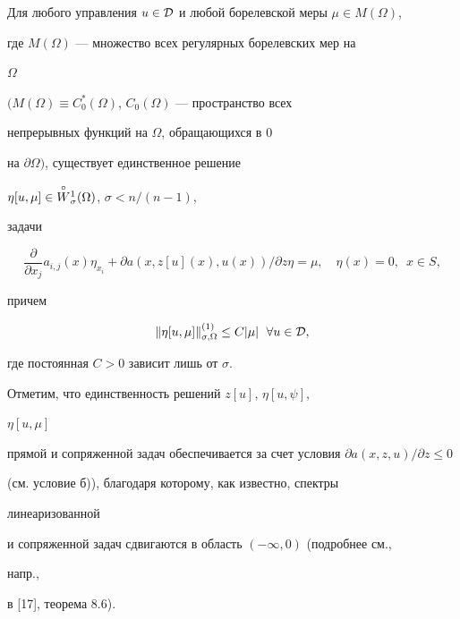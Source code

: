 \begin{lems} 


Для любого управления $u\in\cal D$ и любой борелевской меры $\mu\in 


M(\Omega)$, 


где $M(\Omega)$ --- множество всех регулярных борелевских мер на 


$\Omega$


$(M(\Omega)\equiv C^*_0(\Omega)$, $C_0(\Omega)$ --- пространство всех 


непрерывных функций на $\Omega$, обращающихся в $0$ 


на $\partial\Omega)$, существует единственное решение 


$\eta[u,\mu]\in\overset{\circ}{W}{}^1_\sigma(\Omega)$, $\sigma<n/(n-1)$, 


задачи 


\begin{equation} 


\frac{\partial}{\partial x_j}a_{i,j}(x)\eta_{x_i}+ 


\partial a(x,z[u](x),u(x))/\partial z\eta=\mu,\quad 


\eta(x)=0,\ \; x\in S, 


\end{equation} 


причем 


$$ 


\|\eta[u,\mu]\|^{(1)}_{\sigma,\Omega}\le C|\mu| 


\ \; \forall u\in\cal D, 


$$ 


где постоянная $C>0$ зависит лишь от $\sigma$. 


\end{lems} 


 


\begin{notes} 


Отметим, что единственность решений $z[u]$, $\eta[u,\psi]$, 


$\eta[u,\mu]$ 


прямой и сопряженной задач обеспечивается за счет условия $\partial 


a(x,z,u)/\partial z\le0$ 


(см. условие б)), благодаря которому, как известно, спектры 


линеаризованной 


и сопряженной задач сдвигаются в область $(-\infty,0)$ (подробнее см., 


напр., 


в [17], теорема 8.6). 


\end{notes} 


